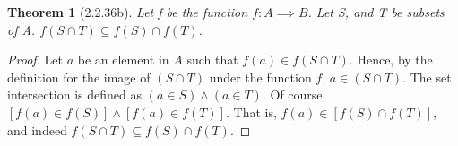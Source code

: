\documentclass[a4paper, 12pt]{article}
\theoremstyle{plain}
\newtheorem*{theorem*}{Theorem}
\begin{document}
	
	\begin{theorem*}[2.2.36b]
		Let f be the function $f: A \implies B$. Let S, and T be subsets of A. $f(S \cap T) \subseteq f(S) \cap f(T)$.
	\end{theorem*}
	
	\begin{proof}
		Let $a$ be an element in $A$ such that $f(a) \in f(S \cap T)$. Hence, by the definition for the image of $(S \cap T)$ under the function $f$, $a \in (S \cap T)$. The set intersection is defined as $(a \in S) \land (a \in T)$. Of course \newline $[f(a) \in f(S)] \land [f(a) \in f(T)]$. That is, $f(a) \in [f(S) \cap f(T)]$, and indeed $f(S \cap T) \subseteq f(S) \cap f(T)$.
	\end{proof}
\end{document}
